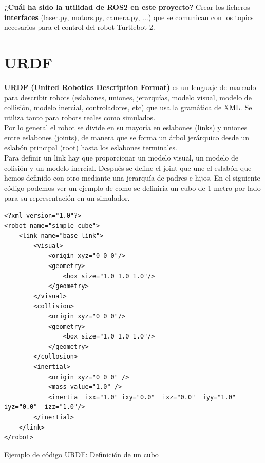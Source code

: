 \textbf{¿Cuál ha sido la utilidad de ROS2 en este proyecto?} Crear los ficheros \textbf{interfaces} (laser.py, motors.py, camera.py, ...) que se comunican con los topics necesarios para el control del robot Turtlebot 2.




\section{URDF}
\label{sec:urdf}

\textbf{URDF (United Robotics Description Format)} es un lenguaje de marcado para describir robots (eslabones, uniones, jerarquías, modelo visual, modelo de collisión, modelo inercial, controladores, etc) que usa la gramática de XML. Se utiliza tanto para robots reales como simulados.\\

Por lo general el robot se divide en su mayoría en eslabones (links) y uniones entre eslabones (joints), de manera que se forma un árbol jerárquico desde un eslabón principal (root) hasta los eslabones terminales.\\

Para definir un link hay que proporcionar un modelo visual, un modelo de colisión y un modelo inercial. Después se define el joint que une el eslabón que hemos definido con otro mediante una jerarquía de padres e hijos. En el siguiente código podemos ver un ejemplo de como se definiría un cubo de 1 metro por lado para su representación en un simulador.\\

\begin{code}[H]
\begin{lstlisting}
<?xml version="1.0"?>
<robot name="simple_cube">
	<link name="base_link">
		<visual>
			<origin xyz="0 0 0"/>
			<geometry>
				<box size="1.0 1.0 1.0"/>
			</geometry>
		</visual>
		<collision>
			<origin xyz="0 0 0"/>
			<geometry>
				<box size="1.0 1.0 1.0"/>
			</geometry>
		</collosion>
		<inertial>
			<origin xyz="0 0 0" /> 
			<mass value="1.0" />
			<inertia  ixx="1.0" ixy="0.0"  ixz="0.0"  iyy="1.0"  iyz="0.0"  izz="1.0"/>
		</inertial>
	</link>
</robot>
\end{lstlisting}
\caption[Ejemplo de código URDF: Definición de un cubo]{Ejemplo de código URDF: Definición de un cubo}
\label{cod:codigo_urdf}
\end{code}

